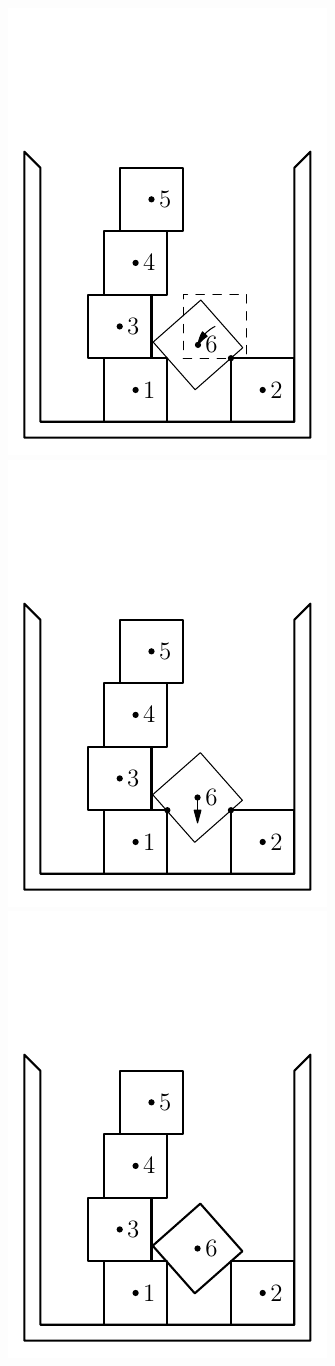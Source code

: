 \documentclass[12pt, sumlimits, intlimits]{article}
\begin{document}
\begin{figure}
\includegraphics[width=\w]{btr-9}%
\includegraphics[width=\w]{btr-10}%
\includegraphics[width=\w]{btr-11}

\end{figure}
\end{document}
